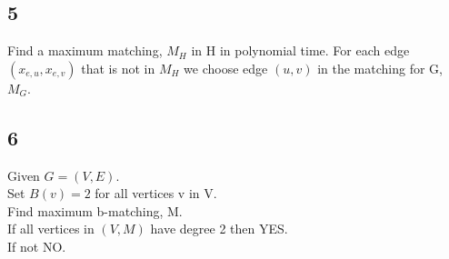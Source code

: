 \documentclass[a4paper]{article}
\begin{document}
\subsection*{5}
Find a maximum matching, $M_H$ in H in polynomial time. For each edge $(x_{e,u},x_{e,v})$ that is not in $M_H$ we choose edge $(u,v)$ in the matching for G, $M_G$. 
\subsection*{6}
Given $G=(V,E)$.\\
Set $B(v)=2$ for all vertices v in V.\\
Find maximum b-matching, M.\\
If all vertices in $(V,M)$ have degree 2 then YES. \\
If not NO.
\end{document}
